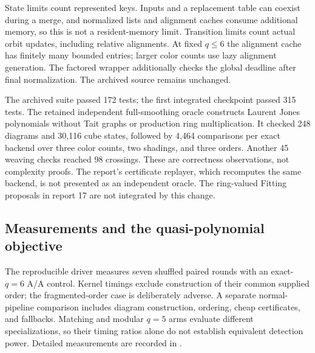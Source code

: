State limits count represented keys. Inputs and a replacement table can
coexist during a merge, and normalized lists and alignment caches consume
additional memory, so this is not a resident-memory limit. Transition
limits count actual orbit updates, including relative alignments.
At fixed $q\le6$ the alignment cache has finitely many bounded entries;
larger color counts use lazy alignment generation.
The factored wrapper additionally checks the global deadline after final
normalization. The archived source remains unchanged.

The archived suite passed 172 tests; the first integrated checkpoint passed
315 tests. The retained independent full-smoothing oracle constructs Laurent
Jones polynomials without Tait graphs or production ring multiplication.
It checked 248 diagrams and 30,116 cube states, followed by 4,464 comparisons
per exact backend over three color counts, two shadings, and three orders.
Another 45 weaving checks reached 98 crossings. These are correctness
observations, not complexity proofs. The report's certificate replayer,
which recomputes the same backend, is not presented as an independent oracle.
The ring-valued Fitting proposals in report 17 are not integrated by this change.

\subsection{Measurements and the quasi-polynomial objective}
\label{sec:potts-measurements}
The reproducible driver  measures seven
shuffled paired rounds with an exact-$q=6$ A/A control. Kernel timings
exclude construction of their common supplied order; the fragmented-order
case is deliberately adverse. A separate normal-pipeline comparison includes
diagram construction, ordering, cheap certificates, and fallbacks. Matching
and modular $q=5$ arms evaluate different specializations, so their timing
ratios alone do not establish equivalent detection power.
Detailed measurements are recorded in
.

